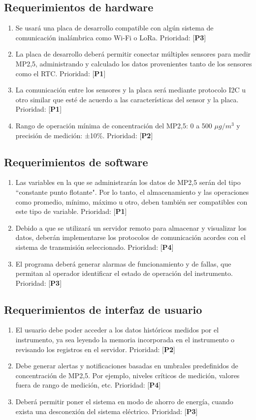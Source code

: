 \subsection{Requerimientos de hardware}
\begin{enumerate}[label=\alph*)]
	\item Se usará una placa de desarrollo compatible con algún sistema de comunicación inalámbrica como Wi-Fi o LoRa. Prioridad: [\textbf{P3}]
	\item La placa de desarrollo deberá permitir conectar múltiples sensores para medir MP2,5, administrando y calculado los datos provenientes tanto de los sensores como el RTC. Prioridad: [\textbf{P1}]
	\item La comunicación entre los sensores y la placa será mediante protocolo I2C u otro similar que esté de acuerdo a las características del sensor y la placa. Prioridad: [\textbf{P1}]
	\item Rango de operación mínima de concentración del MP2,5: 0 a 500 $\mu g/m^3$ y precisión de medición: ±10\%. Prioridad: [\textbf{P2}]
\end{enumerate}
\subsection{Requerimientos de software}
\begin{enumerate}[label=\alph*)]
	\item Las variables en la que se administrarán los datos de MP2,5 serán del tipo ``constante punto flotante". Por lo tanto, el almacenamiento y las operaciones como promedio, mínimo, máximo u otro, deben también ser compatibles con este tipo de variable. Prioridad: [\textbf{P1}]
	\item Debido a que se utilizará un servidor remoto para almacenar y visualizar los datos, deberán implementarse los protocolos de comunicación acordes con el sistema de transmisión seleccionado. Prioridad: [\textbf{P4}]
	\item El programa deberá generar alarmas de funcionamiento y de fallas, que permitan al operador identificar el estado de operación del instrumento. Prioridad: [\textbf{P3}]
\end{enumerate}

\subsection{Requerimientos de interfaz de usuario}
\begin{enumerate}[label=\alph*)]
	\item El usuario debe poder acceder a los datos históricos medidos por el instrumento, ya sea leyendo la memoria incorporada en el instrumento o revisando los registros en el servidor. Prioridad: [\textbf{P2}]
	\item Debe generar alertas y notificaciones basadas en umbrales predefinidos de concentración de MP2,5. Por ejemplo, niveles críticos de medición, valores fuera de rango de medición, etc. Prioridad: [\textbf{P4}]
	\item Deberá permitir poner el sistema en modo de ahorro de energía, cuando exista una desconexión del sistema eléctrico. Prioridad: [\textbf{P3}]
\end{enumerate}
